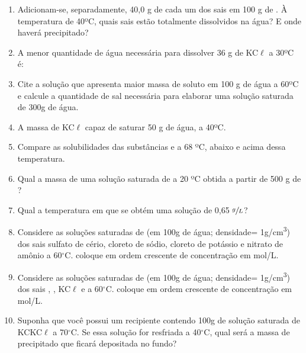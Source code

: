 \documentclass[a4paper,12]{exam}
\begin{document}
\begin{multicols}{2}
\begin{questions}
			\begin{enumerate}[label=\alph*)]	
				\item Adicionam-se, separadamente, 40,0 g de cada um dos sais em 100 g de . À temperatura de
40ºC, quais sais estão totalmente dissolvidos na água? E onde haverá precipitado?	\makeemptybox{2cm}

				\item A menor quantidade de água necessária para dissolver 36 g de KC$\ell$ a 30ºC é: \makeemptybox{2cm}
		
				\item Cite a solução que apresenta maior massa de soluto em 100 g de água a 60ºC e calcule a quantidade de sal necessária para elaborar uma solução saturada de 300g de água. \makeemptybox{2cm}
		
				\item A massa de KC$\ell$ capaz de saturar 50 g de água, a 40ºC.\makeemptybox{2cm}
				
				\item Compare as solubilidades das substâncias  e  a 68 ºC, abaixo e acima dessa
temperatura. \makeemptybox{2cm}

				\item Qual a massa de uma solução saturada de
 a 20 ºC obtida a partir de 500 g de ?\makeemptybox{2cm}
				
				\item Qual a temperatura em que se obtém uma solução de 0,65 $\sfrac{g}{L}$?
				\makeemptybox{2cm}
				
				\item Considere as soluções saturadas de (em 100g de água; densidade= 1\si{g/cm^3}) dos sais sulfato de cério, cloreto de sódio, cloreto de potássio e nitrato de amônio a 60$^{\circ}$C. coloque em ordem crescente de concentração em mol/L.
				\makeemptybox{2cm}
				
				\item Considere as soluções saturadas de (em 100g de água; densidade= 1\si{g/cm^3}) dos sais , , KC$\ell$ e  a 60$^{\circ}$C. coloque em ordem crescente de concentração em mol/L.
				\makeemptybox{2cm}
				
				\item Suponha que você possui um recipiente contendo 100g de solução saturada de KCKC$\ell$ a 70$^{\circ}$C. Se essa solução for resfriada a 40$^{\circ}$C, qual será a massa de precipitado que ficará depositada no fundo?
				\makeemptybox{2cm}
				

\end{enumerate}
\end{questions}
\end{multicols}
\end{document}
